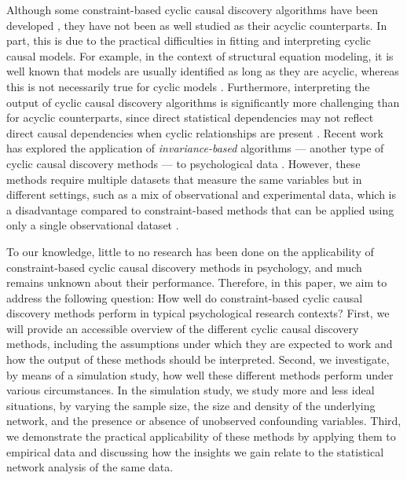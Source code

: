 \documentclass[twoside, 11pt]{article}
\begin{document}
Although some constraint-based cyclic causal discovery algorithms have been developed \citep{mooij_classen2020, richardson1996, strobl2019}, they have not been as well studied as their acyclic counterparts. In part, this is due to the practical difficulties in fitting and interpreting cyclic causal models. 
For example, in the context of structural equation modeling, it is well known that models are usually identified as long as they are acyclic, whereas this is not necessarily true for cyclic models \citep{Bongers2021, bollen_structural_1989}.
Furthermore, interpreting the output of cyclic causal discovery algorithms is significantly more challenging than for acyclic counterparts, since direct statistical dependencies may not reflect direct causal dependencies when cyclic relationships are present \citep{bongers2018theoretical, hyttinen_discovering_2013}. 
Recent work has explored the application of \textit{invariance-based} algorithms --- another type of cyclic causal discovery methods --- to psychological data \citep{Kossakowski2021}. However, these methods require multiple datasets that measure the same variables but in different settings, such as a mix of observational and experimental data, which is a disadvantage compared to constraint-based methods that can be applied using only a single observational dataset \citep{peters_causal_2016, Glymour2019}.

To our knowledge, little to no research has been done on the applicability of constraint-based cyclic causal discovery methods in psychology, and much remains unknown about their performance.
Therefore, in this paper, we aim to address the following question: How well do constraint-based cyclic causal discovery methods perform in typical psychological research contexts? First, we will provide an accessible overview of the different cyclic causal discovery methods, including the assumptions under which they are expected to work and how the output of these methods should be interpreted. Second, we investigate, by means of a simulation study, how well these different methods perform under various circumstances. In the simulation study, we study more and less ideal situations, by varying the sample size, the size and density of the underlying network, and the presence or absence of unobserved confounding variables. Third, we demonstrate the practical applicability of these methods by applying them to empirical data \citep{mcnally_co-morbid_2017} and discussing how the insights we gain relate to the statistical network analysis of the same data.
\end{document}
